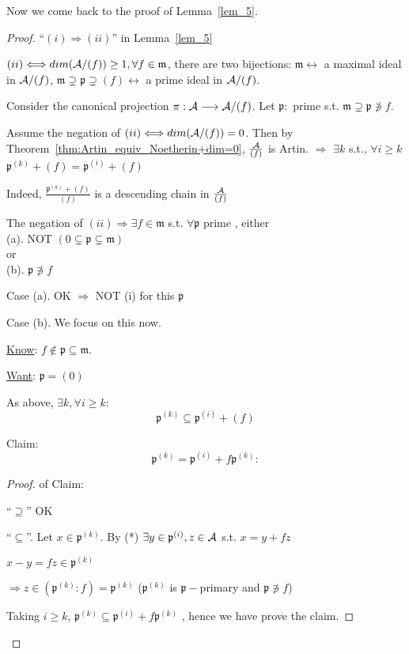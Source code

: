 \documentclass[11pt]{article}
\newcommand{\scm}{{\mathfrak m}}
\newcommand{\scp}{{\mathfrak p}}
\newcommand{\cala}{{\cal A}}
\newcommand{\Lrta}{\Longrightarrow}
\newcommand{\lrta}{\longrightarrow}
\newcommand{\llrta}{\longleftrightarrow}
\newcommand{\Llrta}{\Longleftrightarrow}
\begin{document}
Now we come back to the proof of Lemma~\ref{lem_5}.
\begin{proof}
``$(i)\Lrta(ii)$'' in Lemma~\ref{lem_5}

$(ii)\Llrta dim(\cala/(f))\geq 1, \forall f\in\scm$, there are two bijections: $\scm\llrta$ a maximal ideal in $\cala/(f)$, $\scm\supsetneq\scp\supsetneq(f)\llrta$ a prime ideal in $\cala/(f)$.

Consider the canonical projection $\pi:\cala\lrta \cala/(f)$. Let $\scp:$ prime s.t. $\scm\supsetneq \scp\not \ni f$.

Assume the negation of $(ii)\Llrta dim(\cala/(f))=0$. Then by Theorem~\ref{thm:Artin_equiv_Noetherin+dim=0},
$\frac{\cala}{(f)}$ is  Artin. $\Lrta$ $\exists k$ s.t., $\forall i\geq k$ $\scp^{(k)}+(f)=\scp^{(i)}+(f)$

Indeed, $\frac{\scp^{(k)}+(f)}{(f)}$ is a descending chain in $\frac{\cala}{(f)}$

The negation of $(ii)\Lrta\exists f\in \scm$ s.t. $\forall \scp$ prime , either\\
(a). NOT $(0\subsetneq \scp\subsetneq\scm)$\\
or\\
(b). $\scp\not\ni f$

Case (a). OK $\Lrta $ NOT (i) for this $\scp$

Case (b). We focus on this now.

\underline{Know}: $f\notin \scp\subseteq \scm$.

\underline{Want}: $\scp=(0)$

As above, $\exists k,\forall i\geq k$: 
\begin{equation}\tag{*}
\scp^{(k)}\subseteq\scp^{(i)}+(f)
\end{equation}

Claim:
\begin{equation}\tag{**}
\scp^{(k)}=\scp^{(i)}+f\scp^{(k)}:
\end{equation}
\begin{proof} of Claim:

``$\supseteq$'' OK

``$\subseteq$''. Let $x\in\scp^{(k)}$. By (*) $\exists y\in\scp^{(i)},z\in\cala$ s.t. $x=y+fz$

$x-y=fz\in \scp^{(k)}$

$\Lrta z\in(\scp^{(k)}:f)=\scp^{(k)}$ ($\scp^{(k)}$ is $\scp-$primary and $\scp\not\ni f$)

Taking $i\geq k$,
$
\scp^{(k)}\subseteq\scp^{(i)}+f\scp^{(k)}
$
, hence we have prove the claim.
\end{proof}


\end{proof}
\end{document}
